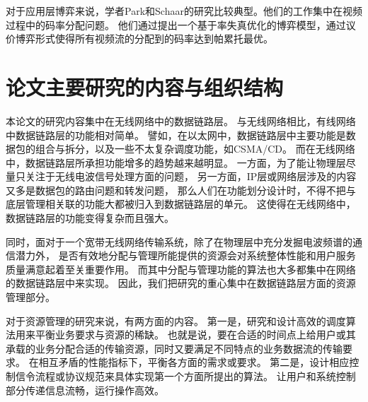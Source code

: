 对于应用层博弈来说，学者Park和Schaar的研究比较典型。他们的工作集中在视频过程中的码率分配问题\cite{ParkSchaar:2007}\cite{ParkSchaar:2007ICASSP}。
他们通过提出一个基于率失真优化的博弈模型，通过议价博弈形式使得所有视频流的分配到的码率达到帕累托最优。

\section{论文主要研究的内容与组织结构}
本论文的研究内容集中在无线网络中的数据链路层。
与无线网络相比，有线网络中数据链路层的功能相对简单。
譬如，在以太网中，数据链路层中主要功能是数据包的组合与拆分，以及一些不太复杂调度功能，如CSMA/CD。
而在无线网络中，数据链路层所承担功能增多的趋势越来越明显。
一方面，为了能让物理层尽量只关注于无线电波信号处理方面的问题，
另一方面，IP层或网络层涉及的内容又多是数据包的路由问题和转发问题，
那么人们在功能划分设计时，不得不把与底层管理相关联的功能大都被归入到数据链路层的单元。
这使得在无线网络中，数据链路层的功能变得复杂而且强大。

同时，面对于一个宽带无线网络传输系统，除了在物理层中充分发掘电波频谱的通信潜力外，
是否有效地分配与管理所能提供的资源会对系统整体性能和用户服务质量满意起着至关重要作用。
而其中分配与管理功能的算法也大多都集中在网络的数据链路层中来实现。
因此，我们把研究的重心集中在数据链路层方面的资源管理部分。

对于资源管理的研究来说，有两方面的内容。
第一是，研究和设计高效的调度算法用来平衡业务要求与资源的稀缺。
也就是说，要在合适的时间点上给用户或其承载的业务分配合适的传输资源，同时又要满足不同特点的业务数据流的传输要求。
在相互矛盾的性能指标下，平衡各方面的需求或要求。
第二是，设计相应控制信令流程或协议规范来具体实现第一个方面所提出的算法。
让用户和系统控制部分传递信息流畅，运行操作高效。


